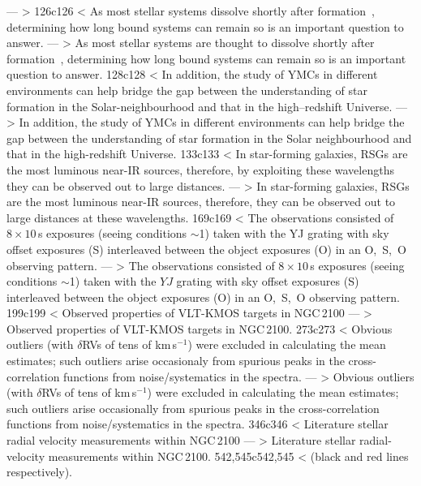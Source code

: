 ---
> 
126c126
< As most stellar systems dissolve shortly after formation~\citep{2003ARA&A..41...57L}, determining how long bound systems can remain so is an important question to answer.
---
> As most stellar systems are thought to dissolve shortly after formation~\citep{2003ARA&A..41...57L}, determining how long bound systems can remain so is an important question to answer.
128c128
< In addition, the study of YMCs in different environments can help bridge the gap between the understanding of star formation in the Solar-neighbourhood and that in the high--redshift Universe.
---
> In addition, the study of YMCs in different environments can help bridge the gap between the understanding of star formation in the Solar neighbourhood and that in the high-redshift Universe.
133c133
< In star-forming galaxies, RSGs are the most luminous near-IR sources, therefore, by exploiting these wavelengths they can be observed out to large distances.
---
> In star-forming galaxies, RSGs are the most luminous near-IR sources, therefore, they can be observed out to large distances at these wavelengths.
169c169
< The observations consisted of $8\times10$\,s exposures (seeing conditions $\sim$1) taken with the YJ grating with sky offset exposures (S) interleaved between the object exposures (O) in an O,~S,~O observing pattern.
---
> The observations consisted of $8\times10$\,s exposures (seeing conditions $\sim$1) taken with the $YJ$ grating with sky offset exposures (S) interleaved between the object exposures (O) in an O,~S,~O observing pattern.
199c199
<         Observed properties of VLT-KMOS targets in NGC\,2100\label{tb:obs-params}
---
>         Observed properties of VLT-KMOS targets in NGC\,2100.\label{tb:obs-params}
273c273
< Obvious outliers (with $\delta$RVs of tens of km\,s$^{-1}$) were excluded in calculating the mean estimates; such outliers arise occasionaly from spurious peaks in the cross-correlation functions from noise/systematics in the spectra.
---
> Obvious outliers (with $\delta$RVs of tens of km\,s$^{-1}$) were excluded in calculating the mean estimates; such outliers arise occasionally from spurious peaks in the cross-correlation functions from noise/systematics in the spectra.
346c346
<         Literature stellar radial velocity measurements within NGC\,2100\label{tb:rvs}
---
>         Literature stellar radial-velocity measurements within NGC\,2100.\label{tb:rvs}
542,545c542,545
< (black and red lines respectively).

